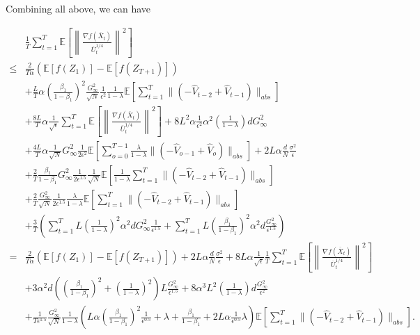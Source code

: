 \documentclass{article} %
\begin{document}
Combining all above, we can have 

\begin{align}\label{eq: final_bound}
 &\frac{1}{T}\sum_{t=1}^T  \mathbb E \left [\left\|\frac{\nabla f( \overline X_{t})}{\overline U_{t}^{1/4}}\right\|^2  \right] \nonumber \\
 \leq & \frac{2}{T\alpha} ( \mathbb E  [f( Z_{1})]  -  \mathbb E [f( Z_{T+1})]) \nonumber \\& 
+ \frac{L}{T}   \alpha \left ( \frac{\beta_1}{1-\beta_1} \right)^2   \frac{ G_{\infty} ^2 }{\sqrt{N}}   \frac{1}{{\epsilon^2}} \frac{1}{1-\lambda}  \mathbb E \left[ \sum_{t=1}^T  \| ( - \hat V_{t-2} + \hat V_{t-1}) \|_{abs} \right]   \nonumber  \\
& + \frac{8L}{T}\alpha\frac{1}{\sqrt{\epsilon}} \sum_{t=1}^T \mathbb E \left[  \left\| \frac{\nabla f(\overline X_{t})}{{\overline U_t^{1/4}}  } \right\|^2 \right] + {8L^2}\alpha  \frac{1}{\epsilon^2}  \alpha^2 \left( \frac{1}{1-\lambda}\right)d G_{\infty}^2 \nonumber \\
& +  \frac{4L}{T}\alpha \frac{1}{\sqrt{N}}  G_{\infty}^2 \frac{1}{2\epsilon^2}   \mathbb E \left[   \sum_{o=0}^{T-1} \frac{\lambda}{1-\lambda}     \|    (- \hat V_{o-1} + \hat V_{o} ) \|_{abs}    \right]  +  {2L}\alpha  \frac{d}{N}
\frac{ \sigma^2 }{\epsilon}  \nonumber \\
&+ \frac{2}{T}\frac{\beta_1}{1-\beta_1} G_{\infty}^2 \frac{1}{2\epsilon^{1.5}} \frac{1}{\sqrt{N}}   \mathbb E \left [  \frac{1}{1-\lambda}   \sum_{t=1}^T  \| ( - \hat V_{t-2} + \hat V_{t-1}) \|_{abs}   \right] \nonumber \\
& + \frac{2}{T} \frac{G_{\infty}^2}{\sqrt{N}}\frac{1}{2\epsilon^{1.5}} \frac{\lambda}{1-\lambda}   \mathbb E \left[ \sum_{t=1}^{T}     \|    (- \hat V_{t-2} + \hat V_{t-1} ) \|_{abs} \right]  \nonumber \\
& + \frac{3}{T} \left ( \sum_{t=1} ^TL\left (\frac{1}{1-\lambda} \right)^2 \alpha ^ 2d G_{\infty}^2 \frac{1}{\epsilon^{1.5}} + \sum_{t=1}^T L\left( \frac{\beta_1}{1-\beta_1}\right)^2 \alpha^2 d \frac{G_{\infty}^2}{\epsilon^{1.5}}\right) \nonumber \\
= &  \frac{2}{T\alpha} ( \mathbb E  [f( Z_{1})]  -  \mathbb E [f( Z_{T+1})]) +  {2L}\alpha  \frac{d}{N}
\frac{ \sigma^2 }{\epsilon} + {8L}\alpha\frac{1}{\sqrt{\epsilon}} \frac{1}{T} \sum_{t=1}^T \mathbb E \left[  \left\| \frac{\nabla f(\overline X_{t})}{{\overline U_t^{1/4}}  } \right\|^2 \right] \nonumber \\
&+  3\alpha^2 d \left(\left( \frac{\beta_1}{1-\beta_1}\right)^2 + \left (\frac{1}{1-\lambda} \right)^2 \right)L  \frac{G_{\infty}^2 }{\epsilon^{1.5}} +  {8}\alpha^3 L^2     \left( \frac{1}{1-\lambda}\right)d \frac{G_{\infty}^2}{\epsilon^2} \nonumber \\
& +   \frac{1}{T \epsilon^{1.5}}  \frac{G_{\infty}^2}{\sqrt{N}} \frac{1}{1-\lambda}  \left( L  \alpha \left ( \frac{\beta_1}{1-\beta_1} \right)^2     \frac{1}{{\epsilon^{0.5}}}  +   \lambda + \frac{\beta_1}{1-\beta_1} + 2L\alpha \frac{1}{\epsilon^{0.5}}\lambda   \right)   \mathbb E \left[ \sum_{t=1}^{T}   \|    (- \hat V_{t-2} + \hat V_{t-1} ) \|_{abs} \right] .
\end{align}
\end{document}
